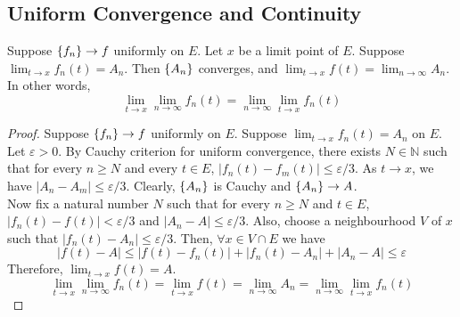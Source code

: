 \subsection{Uniform Convergence and Continuity}
\begin{theorem} %
	Suppose $\left\{f_n\right\} \to f$ uniformly on $E$.
	Let $x$ be a limit point of $E$.
	Suppose $\displaystyle \lim_{t \to x} f_n(t) = A_n$.
	Then $\left\{A_n\right\}$ converges, and 
	$\displaystyle \lim_{t \to x} f(t) = \lim_{n \to \infty} A_n$.
	In other words,
	\[ \lim_{t \to x} \lim_{n \to \infty} f_n(t) = \lim_{n \to \infty} \lim_{t \to x} f_n(t) \]
\end{theorem}
\begin{proof}
	Suppose $\left\{f_n\right\} \to f$ uniformly on $E$.
	Suppose $\displaystyle \lim_{t \to x} f_n(t)  = A_n$ on $E$.
	Let $\varepsilon > 0$.
	By Cauchy criterion for uniform convergence, there exists $N \in \mathbb{N}$ such that for every $n \ge N$ and every $t \in E$, $|f_n(t)-f_m(t)| \le \varepsilon/3$.
	As $t \to x$, we have $|A_n - A_m| \le \varepsilon/3$.
	Clearly, $\left\{A_n\right\}$ is Cauchy and $\left\{A_n\right\} \to A$.\\

	Now fix a natural number $N$ such that for every $n \ge N$ and $t \in E$, $|f_n(t) - f(t) | < \varepsilon /3$ and $|A_n-A| \le \varepsilon/3$.
	Also, choose a neighbourhood $V$ of $x$ such that $|f_n(t) - A_n | \le \varepsilon/3$.
	Then, $\forall x \in V \cap E$ we have
	\[ |f(t) - A| \le |f(t) -f_n(t)| + |f_n(t)-A_n| + |A_n - A| \le \varepsilon \]
	Therefore, $\displaystyle \lim_{t \to x} f(t) = A$.
	\[ \lim_{t \to x} \lim_{n \to \infty} f_n(t) = \lim_{t \to x} f(t)  = \lim_{n \to \infty} A_n = \lim_{n \to \infty} \lim_{t \to x} f_n(t) \]
\end{proof}


